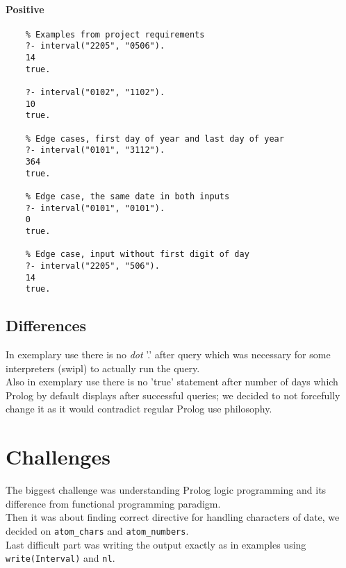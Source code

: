 \documentclass{article}[12pt]
\begin{document}
\paragraph{Positive}
\begin{lstlisting}
    % Examples from project requirements
    ?- interval("2205", "0506").
    14
    true.

    ?- interval("0102", "1102").
    10
    true.

    % Edge cases, first day of year and last day of year
    ?- interval("0101", "3112").
    364
    true.

    % Edge case, the same date in both inputs
    ?- interval("0101", "0101").
    0
    true.

    % Edge case, input without first digit of day
    ?- interval("2205", "506").
    14
    true.
\end{lstlisting}

\subsection{Differences}
In exemplary use there is no \emph{dot} '.' after query which was necessary for some interpreters (swipl) to actually run the query.\\ 
Also in exemplary use there is no 'true' statement after number of days which Prolog by default displays after successful queries; we decided to not forcefully change it as it would contradict regular Prolog use philosophy.

\section{Challenges}
The biggest challenge was understanding Prolog logic programming and its difference from functional programming paradigm.\\ 
Then it was about finding correct directive for handling characters of date, we decided on \lstinline{atom_chars} and \lstinline{atom_numbers}.\\
Last difficult part was writing the output exactly as in examples using \break\lstinline{write(Interval)} and \lstinline{nl}. 
\end{document}
